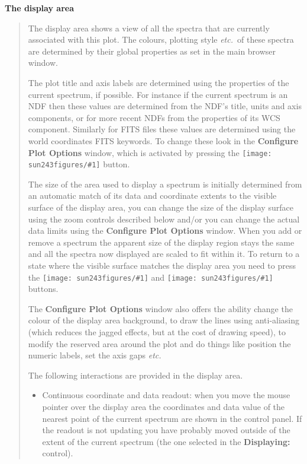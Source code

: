 \documentclass[twoside,11pt]{article}
\newcommand{\htmladdimg}[1]{}
\newcommand{\latexhtml}[2]{#1}
\renewcommand{\_}{\texttt{\symbol{95}}}
\newcommand{\inline}[1]
        {\latexhtml{\texttt{[image: sun243\_figures/\#1]}}
        {\htmladdimg[align=center]{#1.gif}}}
\newcommand{\labelitem}[1]{\textbf{#1}}
\newcommand{\etc}{\textit{etc.}}
\newcommand{\subheading}[1]{\textbf{\large{#1}}}
\begin{document}
\subheading{The display area}
\begin{quote}
 The display area shows a view of all the spectra that are currently
 associated with this plot. The colours, plotting style \etc\ of these
 spectra are determined by their global properties as set in the main
 browser window.

 The plot title and axis labels are determined using the properties of the
 current spectrum, if possible. For instance if the current spectrum is an NDF
 then these values are determined from the NDF's title, units and axis
 components, or for more recent NDFs from the properties of its WCS
 component. Similarly for FITS files these values are determined using the
 world coordinates FITS keywords. To change these look in the
 \labelitem{Configure Plot Options} window, which is activated by pressing the
 \inline{config} button.

 The size of the area used to display a spectrum is initially determined from
 an automatic match of its data and coordinate extents to the visible surface
 of the display area, you can change the size of the display surface using the
 zoom controls described below and/or you can change the actual data limits
 using the \labelitem{Configure Plot Options} window. When you add or remove a
 spectrum the apparent size of the display region stays the same and all the
 spectra now displayed are scaled to fit within it. To return to a state where
 the visible surface matches the display area you need to press the
 \inline{fitwidth} and \inline{fitheight} buttons.

 The \labelitem{Configure Plot Options} window also offers the ability change
 the colour of the display area background, to draw the lines using
 anti-aliasing (which reduces the jagged effects, but at the cost of drawing
 speed), to modify the reserved area around the plot and do things like
 position the numeric labels, set the axis gaps \etc\

 The following interactions are provided in the display area.
 \begin{itemize}

  \item Continuous coordinate and data readout: when you move the mouse
  pointer over the display area the coordinates and data value of the nearest
  point of the current spectrum are shown in the control panel.  If the
  readout is not updating you have probably moved outside of the extent of the
  current spectrum (the one selected in the \labelitem{Displaying:} control).


\end{itemize}
\end{quote}
\end{document}
